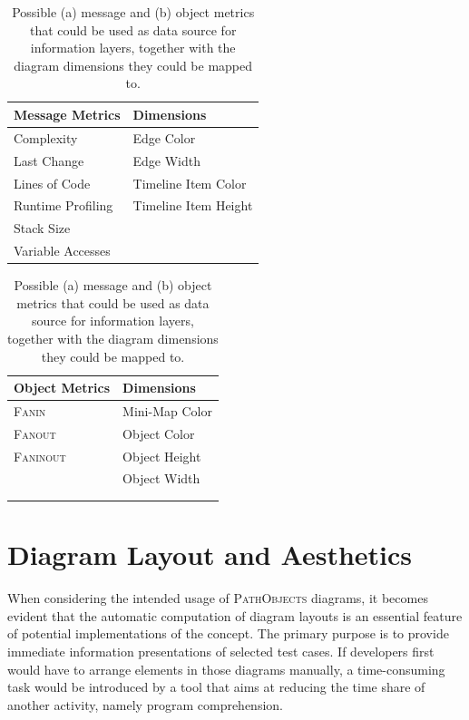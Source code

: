 \begin{table}[tb]
	\centering
	\footnotesize
	\begin{subtable}[t]{0.45\textwidth}
		\begin{tabular}{ll}
		\toprule[1.2pt]
		Message Metrics		& Dimensions 			\\
		\midrule
		Complexity			& Edge Color 			\\
		Last Change			& Edge Width			\\
		Lines of Code		& Timeline Item Color	\\
		Runtime Profiling	& Timeline Item Height	\\
		Stack Size			&						\\
		Variable Accesses	&						\\
		\bottomrule[1.2pt]
		\end{tabular}
		\caption[Message Metrics]{}
	\end{subtable}
	\qquad
	\begin{subtable}[t]{0.45\textwidth}
		\begin{tabular}{ll}
		\toprule[1.2pt]
		Object Metrics		& Dimensions 			\\
		\midrule
		\textsc{Fanin}		& Mini-Map Color		\\
		\textsc{Fanout}		& Object Color			\\
		\textsc{Faninout}	& Object Height			\\
		\hphantom{Runtime Profiling}	& Object Width			\\
							& \hphantom{Timeline Item Height} \\
							& \\
		\bottomrule[1.2pt]
		\end{tabular}
		\caption[Object Metrics]{}
	\end{subtable}
	\caption[Information Layers: Possible Metrics and Diagram Dimensions]{Possible (a) message and (b) object metrics that could be used as data source for information layers, together with the diagram dimensions they could be mapped to.}
	\label{t:ApproachLayers}
\end{table}


\section{Diagram Layout and Aesthetics}
\label{s:ApproachLayout}
When considering the intended usage of \textsc{PathObjects} diagrams, it becomes evident that the automatic computation of diagram layouts is an essential feature of potential implementations of the concept.
The primary purpose is to provide immediate information presentations of selected test cases.
If developers first would have to arrange elements in those diagrams manually, a time-consuming task would be introduced by a tool that aims at reducing the time share of another activity, namely program comprehension.

